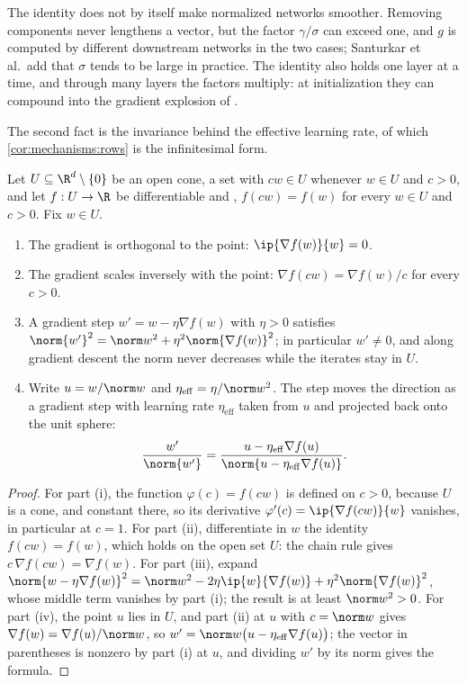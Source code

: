 \begin{refsection}
The identity does not by itself make normalized networks smoother. Removing components never lengthens a vector, but the factor $\gamma/\sigma$ can exceed one, and $g$ is computed by different downstream networks in the two cases; Santurkar et al.\ add that $\sigma$ tends to be large in practice. The identity also holds one layer at a time, and through many layers the factors multiply: at initialization they can compound into the gradient explosion of \textcite{YangEtAl2019}.

The second fact is the invariance behind the effective learning rate, of which \cref{cor:mechanisms:rows} is the infinitesimal form.

\begin{proposition}\label{prop:mechanisms:scale}
Let $U\subseteq\R^d\setminus\{0\}$ be an open cone, a set with $cw\in U$ whenever $w\in U$ and $c>0$, and let $f:U\to\R$ be differentiable and , $f(cw)=f(w)$ for every $w\in U$ and $c>0$. Fix $w\in U$.
\begin{enumerate}
\item The gradient is orthogonal to the point: $\ip{\nabla f(w)}{w}=0$.
\item The gradient scales inversely with the point: $\nabla f(cw)=\nabla f(w)/c$ for every $c>0$.
\item A gradient step $w'=w-\eta\nabla f(w)$ with $\eta>0$ satisfies $\norm{w'}^2=\norm w^2+\eta^2\norm{\nabla f(w)}^2$; in particular $w'\neq0$, and along gradient descent the norm never decreases while the iterates stay in $U$.
\item Write $u=w/\norm w$ and $\eta_{\mathrm{eff}}=\eta/\norm w^2$. The step moves the direction as a gradient step with learning rate $\eta_{\mathrm{eff}}$ taken from $u$ and projected back onto the unit sphere:
\[
\frac{w'}{\norm{w'}}=\frac{u-\eta_{\mathrm{eff}}\nabla f(u)}{\norm{u-\eta_{\mathrm{eff}}\nabla f(u)}}.
\]
\end{enumerate}
\end{proposition}

\begin{proof}
For part (i), the function $\varphi(c)=f(cw)$ is defined on $c>0$, because $U$ is a cone, and constant there, so its derivative $\varphi'(c)=\ip{\nabla f(cw)}{w}$ vanishes, in particular at $c=1$. For part (ii), differentiate in $w$ the identity $f(cw)=f(w)$, which holds on the open set $U$: the chain rule gives $c\,\nabla f(cw)=\nabla f(w)$. For part (iii), expand $\norm{w-\eta\nabla f(w)}^2=\norm w^2-2\eta\ip{w}{\nabla f(w)}+\eta^2\norm{\nabla f(w)}^2$, whose middle term vanishes by part (i); the result is at least $\norm w^2>0$. For part (iv), the point $u$ lies in $U$, and part (ii) at $u$ with $c=\norm w$ gives $\nabla f(w)=\nabla f(u)/\norm w$, so $w'=\norm w\bigl(u-\eta_{\mathrm{eff}}\nabla f(u)\bigr)$; the vector in parentheses is nonzero by part (i) at $u$, and dividing $w'$ by its norm gives the formula.
\end{proof}


\end{refsection}
